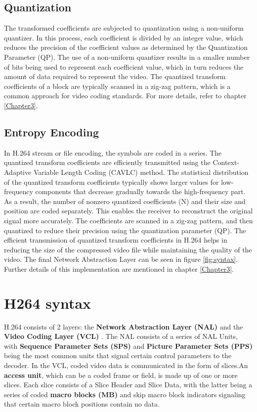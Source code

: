 \subsection{Quantization}
The transformed coefficients are subjected to quantization using a non-uniform quantizer. In this process, each coefficient is divided by an integer value, which reduces the precision of the coefficient values as determined by the Quantization Parameter (QP). The use of a non-uniform quantizer results in a smaller number of bits being used to represent each coefficient value, which in turn reduces the amount of data required to represent the video. The quantized transform coefficients of a block are typically scanned in a zig-zag pattern, which is a common approach for video coding standards. For more details, refer to chapter \ref{Chapter3}.


\subsection{Entropy Encoding}
In H.264 stream or file encoding, the symbols are coded in a series. The quantized transform coefficients are efficiently transmitted using the Context-Adaptive Variable Length Coding (CAVLC) method. The statistical distribution of the quantized transform coefficients typically shows larger values for low-frequency components that decrease gradually towards the high-frequency part. As a result, the number of nonzero quantized coefficients (N) and their size and position are coded separately. This enables the receiver to reconstruct the original signal more accurately. The coefficients are scanned in a zig-zag pattern, and then quantized to reduce their precision using the quantization parameter (QP). The efficient transmission of quantized transform coefficients in H.264 helps in reducing the size of the compressed video file while maintaining the quality of the video. The final Network Abstraction Layer can be seen in figure \ref{fig:syntax}. Further details of this implementation are mentioned in chapter \ref{Chapter3}.


\section{H264 syntax}
H.264 consists of 2 layers: the \textbf{Network Abstraction Layer (NAL)} and the \textbf{Video Coding Layer (VCL)} \cite{richardson2010h264}. The NAL consists of a series of NAL Units, with \textbf{Sequence Parameter Sets (SPS)} and \textbf{Picture Parameter Sets (PPS)} being the most common units that signal certain control parameters to the decoder. In the VCL, coded video data is communicated in the form of slices.An \textbf{access unit}, which can be a coded frame or field, is made up of one or more slices. Each slice consists of a Slice Header and Slice Data, with the latter being a series of coded \textbf{macro blocks (MB)} and skip macro block indicators signaling that certain macro block positions contain no data.

